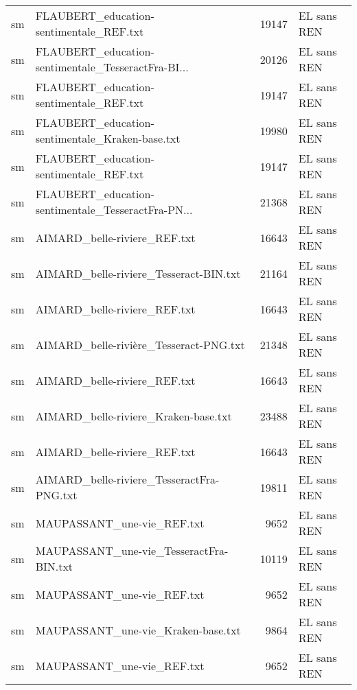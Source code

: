 \begin{tabular}{llrl}
    sm &            FLAUBERT\_education-sentimentale\_REF.txt &                 19147 & EL sans REN \\
    sm & FLAUBERT\_education-sentimentale\_TesseractFra-BI... &                 20126 & EL sans REN \\
    sm &            FLAUBERT\_education-sentimentale\_REF.txt &                 19147 & EL sans REN \\
    sm &    FLAUBERT\_education-sentimentale\_Kraken-base.txt &                 19980 & EL sans REN \\
    sm &            FLAUBERT\_education-sentimentale\_REF.txt &                 19147 & EL sans REN \\
    sm & FLAUBERT\_education-sentimentale\_TesseractFra-PN... &                 21368 & EL sans REN \\
    sm &                       AIMARD\_belle-riviere\_REF.txt &                 16643 & EL sans REN \\
    sm &             AIMARD\_belle-riviere\_Tesseract-BIN.txt &                 21164 & EL sans REN \\
    sm &                       AIMARD\_belle-riviere\_REF.txt &                 16643 & EL sans REN \\
    sm &             AIMARD\_belle-rivière\_Tesseract-PNG.txt &                 21348 & EL sans REN \\
    sm &                       AIMARD\_belle-riviere\_REF.txt &                 16643 & EL sans REN \\
    sm &               AIMARD\_belle-riviere\_Kraken-base.txt &                 23488 & EL sans REN \\
    sm &                       AIMARD\_belle-riviere\_REF.txt &                 16643 & EL sans REN \\
    sm &          AIMARD\_belle-riviere\_TesseractFra-PNG.txt &                 19811 & EL sans REN \\
    sm &                         MAUPASSANT\_une-vie\_REF.txt &                  9652 & EL sans REN \\
    sm &            MAUPASSANT\_une-vie\_TesseractFra-BIN.txt &                 10119 & EL sans REN \\
    sm &                         MAUPASSANT\_une-vie\_REF.txt &                  9652 & EL sans REN \\
    sm &                 MAUPASSANT\_une-vie\_Kraken-base.txt &                  9864 & EL sans REN \\
    sm &                         MAUPASSANT\_une-vie\_REF.txt &                  9652 & EL sans REN \\

\end{tabular}
